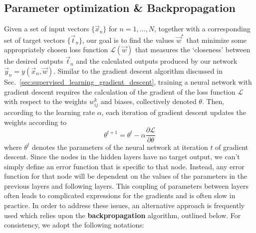 \documentclass[../main.tex]{subfiles}
\begin{document}
\subsection{Parameter optimization \& Backpropagation}
Given a set of input vectors $\{\vec{x}_{n}\}$ for $n = 1, \ldots, N$, together with a corresponding set of target
vectors $\{\vec{t}_{n}\}$, our goal is to find the values $\vec{w}^{*}$ that minimize some appropriately chosen loss
function $\mathcal{L}(\vec{w})$ that measures the `closeness' between the desired outputs $\vec{t}_{n}$ and the
calculated outputs produced by our network $\vec{y}_n = y(\vec{x}_{n}, \vec{w})$.
%
%
Similar to the gradient descent algorithm discussed in Sec.~\ref{sec:supervised_learning_gradient_descent}, training a
neural network with gradient descent requires the calculation of the gradient of the loss function $\mathcal{L}$ with
respect to the weights $w_{ij}^{k}$ and biases, collectively denoted $\theta$.
%
Then, according to the learning rate $\alpha$, each iteration of gradient descent updates the weights according to
%
\begin{equation}
  \theta^{t+1} = \theta^{t} - \alpha \frac{\partial \mathcal{L}}{\partial \theta}
\end{equation}
%
where $\theta^{t}$ denotes the parameters of the neural network at iteration $t$ of gradient descent.
%
Since the nodes in the hidden layers have no target output, we can't simply define an error function that is specific
to that node. 
%
Instead, any error function for that node will be dependent on the values of the parameters in the previous layers and
following layers.
%
This coupling of parameters between layers often leads to complicated expressions for the gradients and is often slow
in practice.
%
In order to address these issues, an alternative approach is frequently used which relies upon the
\textbf{backpropagation} algorithm, outlined below.
%
For consistency, we adopt the following notations:
%
\end{document}
